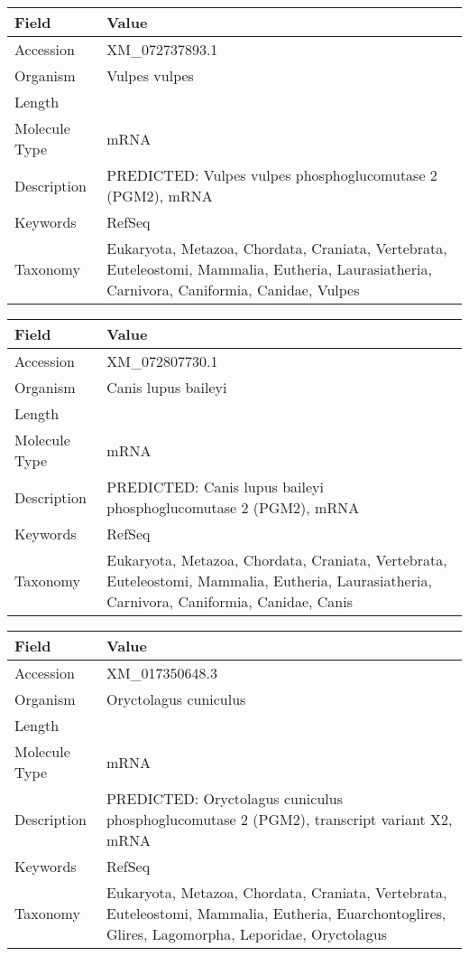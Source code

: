 \documentclass[10pt]{article}
\begin{document}
{\footnotesize
\begin{longtable}{>{\raggedright\arraybackslash}p{4.5cm} >{\raggedright\arraybackslash}p{11.5cm}}
\textbf{Field} & \textbf{Value} \\
\hline
Accession & XM\_072737893.1 \\
Organism & Vulpes vulpes \\
Length & 2779 \\
Molecule Type & mRNA \\
Description & PREDICTED: Vulpes vulpes phosphoglucomutase 2 (PGM2), mRNA \\
Keywords & RefSeq \\
Taxonomy & Eukaryota, Metazoa, Chordata, Craniata, Vertebrata, Euteleostomi, Mammalia, Eutheria, Laurasiatheria, Carnivora, Caniformia, Canidae, Vulpes \\
\end{longtable}
}

{\footnotesize
\begin{longtable}{>{\raggedright\arraybackslash}p{4.5cm} >{\raggedright\arraybackslash}p{11.5cm}}
\textbf{Field} & \textbf{Value} \\
\hline
Accession & XM\_072807730.1 \\
Organism & Canis lupus baileyi \\
Length & 2764 \\
Molecule Type & mRNA \\
Description & PREDICTED: Canis lupus baileyi phosphoglucomutase 2 (PGM2), mRNA \\
Keywords & RefSeq \\
Taxonomy & Eukaryota, Metazoa, Chordata, Craniata, Vertebrata, Euteleostomi, Mammalia, Eutheria, Laurasiatheria, Carnivora, Caniformia, Canidae, Canis \\
\end{longtable}
}

{\footnotesize
\begin{longtable}{>{\raggedright\arraybackslash}p{4.5cm} >{\raggedright\arraybackslash}p{11.5cm}}
\textbf{Field} & \textbf{Value} \\
\hline
Accession & XM\_017350648.3 \\
Organism & Oryctolagus cuniculus \\
Length & 6319 \\
Molecule Type & mRNA \\
Description & PREDICTED: Oryctolagus cuniculus phosphoglucomutase 2 (PGM2), transcript variant X2, mRNA \\
Keywords & RefSeq \\
Taxonomy & Eukaryota, Metazoa, Chordata, Craniata, Vertebrata, Euteleostomi, Mammalia, Eutheria, Euarchontoglires, Glires, Lagomorpha, Leporidae, Oryctolagus \\
\end{longtable}
}
\end{document}
